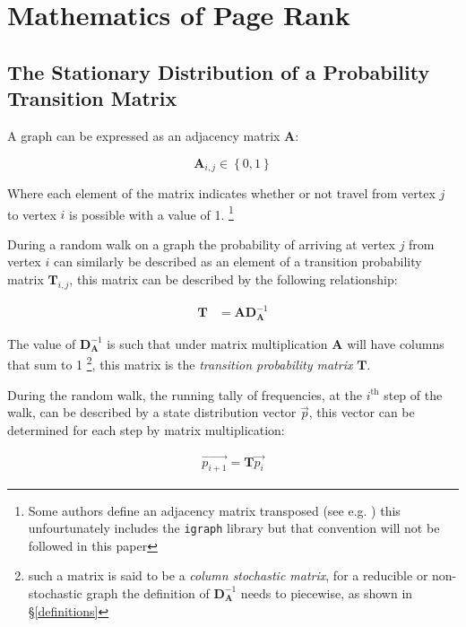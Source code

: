 \documentclass[11pt]{article}
\begin{document}
\section{Mathematics of Page Rank}
\label{PageRank-Generally}
\subsection{The Stationary Distribution of a Probability Transition Matrix}
\label{stationary-distribution-of-t}
A graph can be expressed as an adjacency matrix \(\mathbf{A}\):

\[
\mathbf{A}_{i,j} \in \left\{ 0,1 \right\}
\]

Where each element of the matrix indicates whether or not travel from
vertex \(j\) to vertex \(i\) is possible with a value of 1. \footnote{Some
authors define an adjacency matrix transposed (see e.g.
\cite{rosenDiscreteMathematicsIts2007,meghabghabSearchEnginesLink2008})
this unfourtunately includes the \texttt{igraph} library
\cite{gaborcsardiIgraphManualPages2019} but that convention will not be
followed in this paper}

During a random walk on a graph the probability of arriving at vertex \(j\) from vertex
\(i\) can similarly be described as an element of a transition probability
matrix \(\mathbf{T}_{i,j}\), this matrix can be described by the following
relationship:

\begin{align}
\mathbf{T} &= \mathbf{A} \mathbf{D}^{-1}_{\mathbf{A}} \label{eq:basic-trans-def}
\end{align}

The value of \(\mathbf{D}^{-1}_{\mathbf{A}}\) is such that under matrix
multiplication \(\mathbf{A}\) will have columns that sum to 1 \footnote{such a matrix is said to be a \emph{column stochastic
matrix}, for a
reducible or non-stochastic graph the definition of
\(\mathbf{D}^{-1}_{\mathbf{A}}\) needs to piecewise, as shown in \S \ref{definitions}}, this matrix is the \emph{transition probability
matrix} \(\mathbf{T}\).

During the random walk, the running tally of frequencies, at the
\(i^{\mathrm{th}}\) step of the walk, can be described by a state distribution
vector \(\vec{p}\), this vector can be determined for each step by matrix
multiplication:

\begin{align}
\vec{p_{i+1}} = \mathbf{T}\vec{p_{i}} \label{eq:recurrence}
\end{align}
\end{document}
